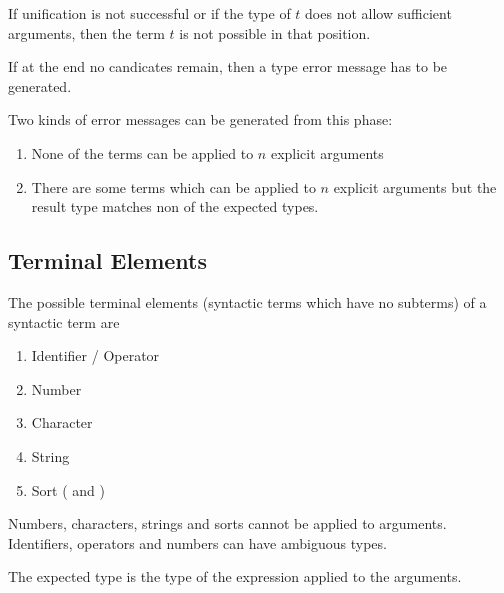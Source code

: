 If unification is not successful or if the type of $t$ does not allow
sufficient arguments, then the term $t$ is not possible in that position.

If at the end no candicates remain, then a type error message has to be
generated.

Two kinds of error messages can be generated from this phase:
\begin{enumerate}
\item None of the terms can be applied to $n$ explicit arguments

\item There are some terms which can be applied to $n$ explicit arguments but
  the result type matches non of the expected types.
\end{enumerate}







\subsection{Terminal Elements}

The possible terminal elements (syntactic terms which have no subterms) of a
syntactic term are
%
\begin{enumerate}

\item Identifier / Operator

\item Number

\item Character

\item String

\item Sort ( and )
\end{enumerate}

Numbers, characters, strings and sorts cannot be applied to
arguments. Identifiers, operators and numbers can have ambiguous types.

The expected type is the type of the expression applied to the arguments.

